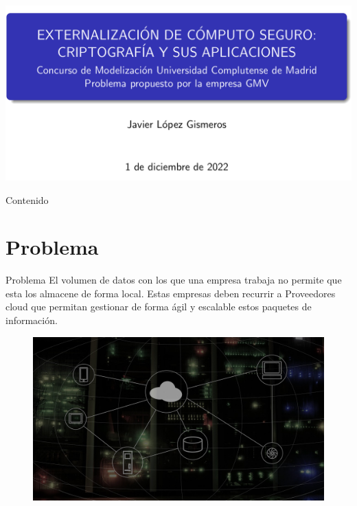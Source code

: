 \documentclass{beamer}
\begin{document}
	
\begin{frame}
    \centering
	\includegraphics[scale = 0.95]{IMG/portada.png}
\end{frame}

\begin{frame}{Contenido}
	\tableofcontents
\end{frame}

\section{Problema}
\begin{frame}{Problema}
	\justifying
    El volumen de datos con los que una empresa trabaja no permite que esta los almacene de forma local. Estas empresas deben recurrir a Proveedores cloud que permitan gestionar de forma ágil y escalable estos paquetes de información. 
    \begin{figure}[H]
    	\centering
		\includegraphics[scale=0.7]{IMG/cloud_computing.jpg}
	\end{figure}

\end{frame}
\end{document}
